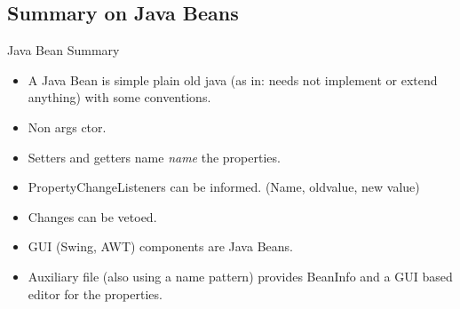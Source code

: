 \subsection{Summary on Java Beans}
\begin{frame}{Java Bean Summary}
  \begin{itemize}
  \item A Java Bean is simple plain old java (as in: needs not implement or
    extend anything) with some conventions.
  \item Non args ctor.
  \item Setters and getters name \textit{name} the properties.
  \item PropertyChangeListeners can be informed. (Name, oldvalue, new
    value)
  \item Changes can be vetoed.
  \item GUI (Swing, AWT) components are Java Beans.
  \item Auxiliary file (also using a name pattern) provides BeanInfo
    and a GUI based editor for the properties.
  \end{itemize}
\end{frame}
